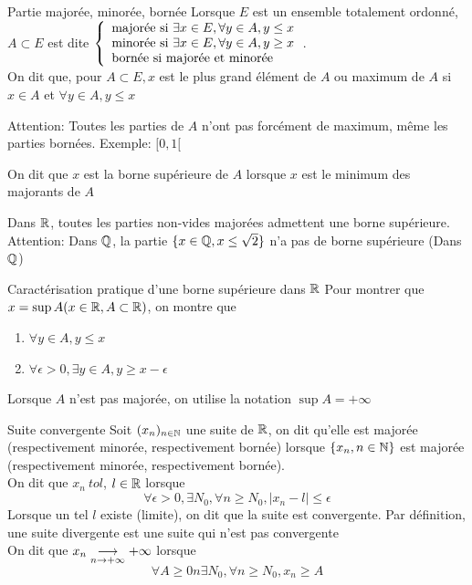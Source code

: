\documentclass[]{report}
\begin{document}
\begin{nt}{Partie majorée, minorée, bornée}{}
    Lorsque $E$ est un ensemble totalement ordonné, $A\subset E$ est dite $\left\{\begin{array}{ll}  \text{majorée si $\exists x\in E, \forall y \in A, y\le x$}\\ \text{minorée si $\exists x\in E, \forall y\in A, y\ge x$}\\ \text{bornée si majorée et minorée} \end{array} \right.$.\\
    On dit que, pour $A\subset E, x$ est le plus grand élément de $A$ ou maximum de $A$ si $x\in A$ et $\forall y\in A, y\le x$
\end{nt}

Attention: Toutes les parties de $A$ n'ont pas forcément de maximum, même les parties bornées. Exemple: $[0,1[$

\begin{nt}{}{}
    On dit que $x$ est la borne supérieure de $A$ lorsque $x$ est le minimum des majorants de $A$
\end{nt}

\begin{prop}{}{}
    Dans $\mathbb{R}$, toutes les parties non-vides majorées admettent une borne supérieure.\\
    Attention: Dans $\mathbb{Q}$, la partie $\{x\in \mathbb{Q},x\le \sqrt{2}\}$ n'a pas de borne supérieure (Dans $\mathbb{Q}$)
\end{prop}

\begin{prop}{Caractérisation pratique d'une borne supérieure dans $\mathbb{R}$}{}
    Pour montrer que $x= \sup A (x\in \mathbb{R}, A\subset \mathbb{R})$, on montre que
    \begin{enumerate}
        \item $\forall y\in A, y\le x$
        \item $\forall \epsilon> 0, \exists y\in A, y\ge x-\epsilon$
    \end{enumerate}
\end{prop}

\begin{nt}{}{}
    Lorsque $A$ n'est pas majorée, on utilise la notation $\sup A= +\infty$
\end{nt}

\begin{df}{Suite convergente}{}
    Soit $(x_n)_{n\in\mathbb{N}}$ une suite de $\mathbb{R}$, on dit qu'elle est majorée (respectivement minorée, respectivement bornée) lorsque $\{x_n,{n\in\mathbb{N}}\}$ est majorée (respectivement minorée, respectivement bornée).\\
    On dit que $x_n\ to l$, $l\in \mathbb{R}$ lorsque
    \[\forall \epsilon >0,\exists N_0,\forall n\ge N_0,\left|x_n-l\right|\le \epsilon\]
    Lorsque un tel $l$ existe (limite), on dit que la suite est convergente. Par définition, une suite divergente est une suite qui n'est pas convergente\\
    On dit que $x_n\underset{n\to +\infty}{\longrightarrow} +\infty$ lorsque
    \[\forall A\ge 0n \exists N_0, \forall n\ge N_0, x_n \ge A\]
\end{df}
\end{document}
